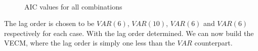 \begin{figure}[H]
  \centering
  \quad
  \\
  \quad
  \caption{AIC values for all combinations}
  \label{fig:AIC_plots}
\end{figure}
The lag order is chosen to be $VAR(6)$, $VAR(10)$, $VAR(6)$ and $VAR(6)$ respectively for each case. With the lag order determined. We can now build the VECM, where the lag order is simply one less than the $VAR$ counterpart.

